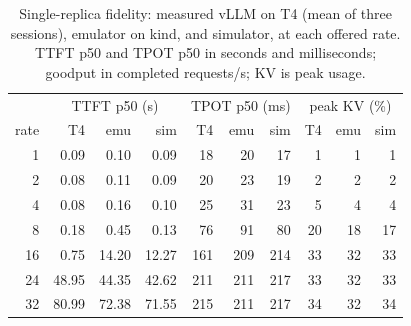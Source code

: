 \begin{table}[t]
\centering
\caption{Single-replica fidelity: measured vLLM on T4 (mean of three sessions),
emulator on kind, and simulator, at each offered rate. TTFT p50 and TPOT p50 in
seconds and milliseconds; goodput in completed requests/s; KV is peak usage.}
\label{tab:fidelity}
\small
\setlength{\tabcolsep}{3pt}
\begin{tabular}{r|rrr|rrr|rrr}
\toprule
 & \multicolumn{3}{c|}{TTFT p50 (s)} & \multicolumn{3}{c|}{TPOT p50 (ms)} & \multicolumn{3}{c}{peak KV (\%)} \\
rate & T4 & emu & sim & T4 & emu & sim & T4 & emu & sim \\
\midrule
1 & 0.09 & 0.10 & 0.09 & 18 & 20 & 17 & 1 & 1 & 1 \\
2 & 0.08 & 0.11 & 0.09 & 20 & 23 & 19 & 2 & 2 & 2 \\
4 & 0.08 & 0.16 & 0.10 & 25 & 31 & 23 & 5 & 4 & 4 \\
8 & 0.18 & 0.45 & 0.13 & 76 & 91 & 80 & 20 & 18 & 17 \\
16 & 0.75 & 14.20 & 12.27 & 161 & 209 & 214 & 33 & 32 & 33 \\
24 & 48.95 & 44.35 & 42.62 & 211 & 211 & 217 & 33 & 32 & 33 \\
32 & 80.99 & 72.38 & 71.55 & 215 & 211 & 217 & 34 & 32 & 34 \\
\bottomrule
\end{tabular}
\end{table}
